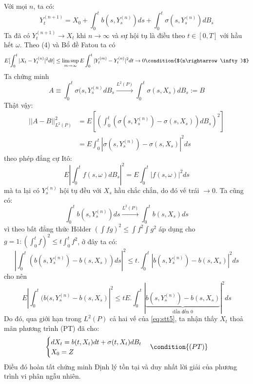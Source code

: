 \documentclass[14pt,a4paper]{article}
\numberwithin{equation}{section}
\begin{document}
Với mọi $n$, ta có:
\begin{equation}\label{eq:stt5}
	Y_t^{(n+1)}=X_0+\int_0^tb(s,Y_s^{(n)})ds+\int_0^t\sigma(s,Y_s^{(n)})dB_s
\end{equation}
Ta đã có $Y_t^{(n+1)}\rightarrow X_t$ khi $n\rightarrow\infty$ và sự hội tụ là điều theo $t\in[0,T]$ với hầu hết $\omega$. Theo (4) và Bổ đề Fatou ta có
\begin{equation*}
	E[\int_0^t|X_t-Y_t^{(n)}|^2dt]\leq\limsup_{m\rightarrow\infty}E\int_0^t|Y_t^{(m)}-Y_t^{(n)}|^2dt\rightarrow0\condition{$(n\rightarrow\infty)$}
\end{equation*}
Ta chứng minh
\begin{equation*}
	A\equiv\int_0^t\sigma(s,Y_s^{(n)}dB_s\xrightarrow{L^2(P)}\int_0^t\sigma(s,X_s)dB_s:=B
\end{equation*}
Thật vậy:
\begin{equation*}
	\begin{split}
		||A-B||^2_{L^2(P)}&=E\left[(\int_0^t(\sigma(s,Y_s^{(n)})-\sigma(s,X_s))dB_s)^2\right]\\
		&=E\int_0^t|\sigma(s,Y_s^{(n)})-\sigma(s,X_s)|^2ds
	\end{split}
\end{equation*}
theo phép đẳng cự Itô:
\begin{equation*}
	E\left|\int_0^tf(s,\omega)dB_s \right|^2=E\int_0^t|f(s,\omega)|^2ds
\end{equation*}
mà ta lại có $Y_s^{(n)}$ hội tụ đều với $X_s$ hầu chắc chắn, do đó vế trái $\rightarrow0$. Ta cũng có:
\begin{equation*}
	\int_0^tb(s,Y_s^{(n)})ds\xrightarrow{L^2(P)}\int_0^tb(s,X_s)ds
\end{equation*}
vì theo bất đẳng thức Hölder $(\int fg)^2\leq\int f^2 \int g^2$ áp dụng cho $g=1:(\int_0^t f)^2\leq t\int_0^t f^2$, ở đây ta có:
\begin{equation*}
	\left|\int_0^t(b(s,Y_s^{(n)})-b(s,X_s))ds \right|^2\leq t.\int_0^t|b(s,Y_s^{(n)})-b(s,X_s)|^2ds
\end{equation*}
cho nên
\begin{equation*}
	E\left|\int_0^t(b(s,Y_s^{(n)}-b(s,X_s) \right|^2\leq tE.\int_0^t|\underbrace{ b(s,Y_s^{(n)})-b(s,X_s)}_{\text{dần đến 0}}|^2ds
\end{equation*}
Do đó, qua giới hạn trong $L^2(P)$ cả hai vế của \eqref{eq:stt5}, ta nhận thấy $X_t$ thoả mãn phương trình (PT) đã cho:
\begin{equation*}
	\begin{cases}
		dX_t=b(t,X_t)dt+\sigma(t,X_t)dB_t\\
		X_0=Z
	\end{cases}\condition{(PT)}
\end{equation*}
Điều đó hoàn tất chứng minh Định lý tồn tại và duy nhất lời giải của phương trình vi phân ngẫu nhiên.
\end{document}
